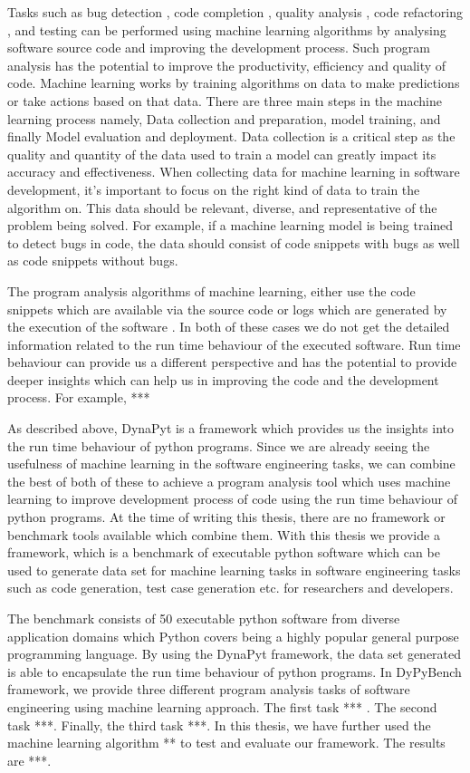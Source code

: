 Tasks such as bug detection \cite{DeepBugs2018}, code completion \cite{code_completion}, quality analysis \cite{Code_analysis_1, Code_analysis_2}, code refactoring \cite{code_refactoring}, and testing \cite{testing_1, testing_2, testing_3} can be performed using machine learning algorithms by analysing software source code and improving the development process. Such program analysis has the potential to improve the productivity, efficiency and quality of code. Machine learning works by training algorithms on data to make predictions or take actions based on that data. There are three main steps in the machine learning process namely, Data collection and preparation, model training, and finally Model evaluation and deployment. Data collection is a critical step as the quality and quantity of the data used to train a model can greatly impact its accuracy and effectiveness. When collecting data for machine learning in software development, it's important to focus on the right kind of data to train the algorithm on. This data should be relevant, diverse, and representative of the problem being solved. For example, if a machine learning model is being trained to detect bugs in code, the data should consist of code snippets with bugs as well as code snippets without bugs.

The program analysis algorithms of machine learning, either use the code snippets which are available via the source code\cite{static_code_analysis} or logs which are generated by the execution of the software \cite{loglens}. In both of these cases we do not get the detailed information related to the run time behaviour of the executed software. Run time behaviour can provide us a different perspective and has the potential to provide deeper insights which can help us in improving the code and the development process. For example, ***

As described above, DynaPyt is a framework which provides us the insights into the run time behaviour of python programs. Since we are already seeing the usefulness of machine learning in the software engineering tasks, we can combine the best of both of these to achieve a program analysis tool which uses machine learning to improve development process of code using the run time behaviour of python programs. At the time of writing this thesis, there are no framework or benchmark tools available which combine them. With this thesis we provide a framework,  which is a benchmark of executable python software which can be used to generate data set for machine learning tasks in software engineering tasks such as code generation, test case generation etc. for researchers and developers. 

The benchmark consists of 50 executable python software from diverse application domains which Python covers being a highly popular general purpose programming language. By using the DynaPyt framework, the data set generated is able to encapsulate the run time behaviour of python programs. In DyPyBench framework, we provide three different program analysis tasks of software engineering using machine learning approach. The first task *** . The second task ***. Finally, the third task ***. In this thesis, we have further used the machine learning algorithm ** to test and evaluate our framework. The results are ***. 
